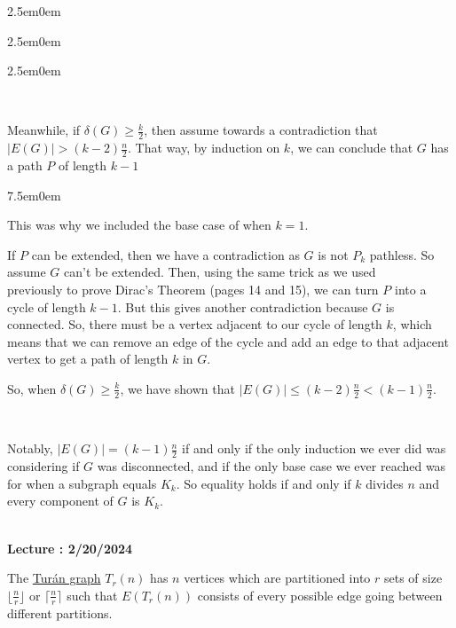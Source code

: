 \documentclass{book}
\newcommand{\myComment}{%
   \color{RawerSienna}%
   \fontsize{12}{14}\selectfont%
}
\newenvironment{myIndent}{%
   \begin{adjustwidth}{2.5em}{0em}%
}{%
   \end{adjustwidth}%
}
\newenvironment{myTindent}{%
   \begin{adjustwidth}{7.5em}{0em}%
}{%
   \end{adjustwidth}%
}
\newcommand{\udefine}[1]{{%
   \setulcolor{Red}%
   \setul{0.14em}{0.07em}%
   \ul{#1}%
}}
\newcounter{LectureNumber}
\newcommand*{\markLecture}[1]{%
   \stepcounter{LectureNumber}%
   {\huge \color{Black} \textbf{Lecture \theLectureNumber: #1} \newline}%
}
\newcommand{\mySepTwo}[1][.]{%
   {\noindent\color{#1}{\rule{6.5in}{0.5mm}}}\\%
}
\newcommand{\retTwo}{\hfill\bigbreak}
\begin{document}
{\begin{myIndent}
{\begin{myIndent}
{\begin{myIndent}
         {\center{\rule{4in}{0.25mm}}\\ [8pt]\par}

         Meanwhile, if $\delta(G) \geq \frac{k}{2}$, then assume towards a contradiction that\\ $|E(G)| > (k - 2)\frac{n}{2}$. That way, by induction on $k$, we can conclude that $G$ has a path $P$ of length $k - 1$
         {\begin{myTindent} \myComment
            This was why we included the base case of when $k = 1$. \retTwo
         \end{myTindent}}

         If $P$ can be extended, then we have a contradiction as $G$ is not $P_k$ pathless. So assume $G$ can't be extended. Then, using the same trick as we used\\ previously to prove Dirac's Theorem (pages 14 and 15), we can turn $P$ into a cycle of length $k - 1$. But this gives another contradiction because $G$ is\\ connected. So, there must be a vertex adjacent to our cycle of length $k$, which means that we can remove an edge of the cycle and add an edge to that adjacent vertex to get a path of length $k$ in $G$.
         \retTwo

         So, when $\delta(G) \geq \frac{k}{2}$, we have shown that $|E(G)| \leq (k - 2)\frac{n}{2} < (k - 1)\frac{n}{2}$.

         {\center{\rule{4in}{0.25mm}}\\ [8pt]\par}

         Notably, $|E(G)| = (k-1)\frac{n}{2}$ if and only if the only induction we ever did was considering if $G$ was disconnected, and if the only base case we ever reached was for when a subgraph equals $K_k$. So equality holds if and only if $k$ divides $n$ and every component of $G$ is $K_k$.
      \end{myIndent}}
   \end{myIndent}} 
\end{myIndent}}

\mySepTwo

\markLecture{2/20/2024}

The \udefine{Turán graph} $T_r(n)$ has $n$ vertices which are partitioned into $r$ sets of size $\lfloor \frac{n}{r} \rfloor$ or $\lceil \frac{n}{r} \rceil$ such that $E(T_r(n))$ consists of every possible edge going between different partitions.
\end{document}
